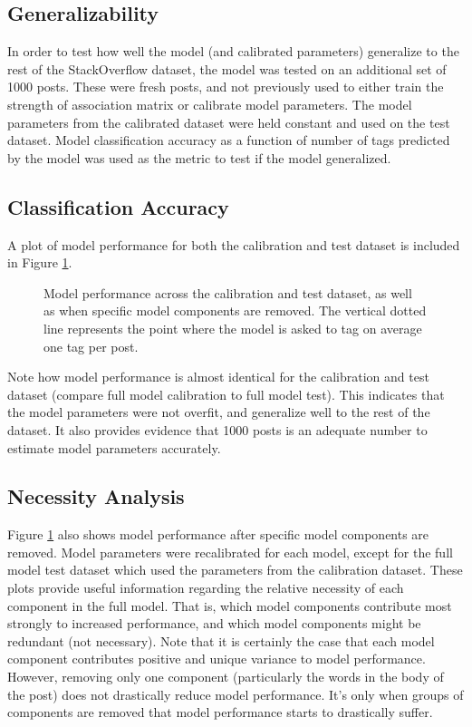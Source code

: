 \documentclass[10pt,letterpaper]{article}
\begin{document}
\subsection{Generalizability}

In order to test how well the model (and calibrated parameters) generalize to the rest of the StackOverflow dataset, the model was tested on an additional set of \num{1000} posts.
These were fresh posts, and not previously used to either train the strength of association matrix or calibrate model parameters.
The model parameters from the calibrated dataset were held constant and used on the test dataset.
Model classification accuracy as a function of number of tags predicted by the model was used as the metric to test if the model generalized.

\subsection{Classification Accuracy}

A plot of model performance for both the calibration and test dataset is included in Figure \ref{fig:ROC}.

\begin{figure}[ht]
  \centering
  \caption{
    Model performance across the calibration and test dataset, as well as when specific model components are removed.
    The vertical dotted line represents the point where the model is asked to tag on average one tag per post.
  }
  \label{fig:ROC}
\end{figure}

Note how model performance is almost identical for the calibration and test dataset (compare full model calibration to full model test).
This indicates that the model parameters were not overfit, and generalize well to the rest of the dataset.
It also provides evidence that \num{1000} posts is an adequate number to estimate model parameters accurately.

\subsection{Necessity Analysis}

Figure \ref{fig:ROC} also shows model performance after specific model components are removed.
Model parameters were recalibrated for each model, except for the full model test dataset which used the parameters from the calibration dataset.
These plots provide useful information regarding the relative necessity of each component in the full model.
That is, which model components contribute most strongly to increased performance, and which model components might be redundant (not necessary).
Note that it is certainly the case that each model component contributes positive and unique variance to model performance.
However, removing only one component (particularly the words in the body of the post) does not drastically reduce model performance.
It's only when groups of components are removed that model performance starts to drastically suffer.
\end{document}

